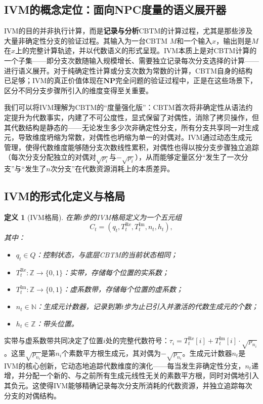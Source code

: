 \documentclass{ctexart}
\newtheorem{definition}[theorem]{定义}
\begin{document}
	\subsection{IVM的概念定位：面向NPC度量的语义展开器}
	
	IVM的目的并非执行计算，而是\textbf{记录与分析}CBTM的计算过程，尤其是那些涉及大量非确定性分支的验证过程。其输入为一台CBTM $M$和一个输入$x$，输出则是$M$在$x$上的完整计算轨迹，并以代数语义的形式呈现。IVM本质上是对CBTM计算的一个子集——即分支次数随输入规模增长、需要独立记录每次分支选择的计算——进行语义展开。对于纯确定性计算或分支次数为常数的计算，CBTM自身的结构已足够；IVM的真正价值体现在$\mathbf{NP}$完全问题的验证过程中，正是在这些场景下，区分不同分支步骤所引入的维度变得至关重要。
	
	我们可以将IVM理解为CBTM的``度量强化版''：CBTM首次将非确定性从语法约定提升为代数事实，内建了不可公度性，显式保留了对偶性，消除了拷贝操作，但其代数结构是静态的——无论发生多少次非确定性分支，所有分支共享同一对生成元，导致维度坍缩为常数，对偶性也坍缩为单一的对偶对。IVM通过动态生成元管理，使得代数维度能够随分支次数线性累积，对偶性也得以按分支步骤独立追踪（每次分支分配独立的对偶对$\sqrt{p_i}$与$-\sqrt{p_i}$），从而能够定量区分``发生了一次分支''与``发生了$n$次分支''在代数资源消耗上的本质差异。
	
	\subsection{IVM的形式化定义与格局}
	
	\begin{definition}[IVM格局]\label{def:ivm-config}
		在第$t$步的IVM格局定义为一个五元组
		\[
		C_t = (q_t, T_t^{\mathrm{Re}}, T_t^{\mathrm{Im}}, n_t, h_t),
		\]
		其中：
		\begin{itemize}
			\item $q_t\in Q$：控制状态，与底层CBTM的当前状态相同；
			\item $T_t^{\mathrm{Re}}:\mathbb{Z}\to\{0,1\}$：实带，存储每个位置的实系数；
			\item $T_t^{\mathrm{Im}}:\mathbb{Z}\to\{0,1\}$：虚系数带，存储每个位置的虚系数；
			\item $n_t\in\mathbb{N}$：生成元计数器，记录到第$t$步为止已引入并激活的代数生成元的个数；
			\item $h_t\in\mathbb{Z}$：带头位置。
		\end{itemize}
	\end{definition}
	
	实带与虚系数带共同决定了位置$i$处的完整代数符号：$\tau_i = T_t^{\mathrm{Re}}[i] + T_t^{\mathrm{Im}}[i]\cdot\sqrt{p_{n_i}}$。这里$\sqrt{p_{n_i}}$是第$n_i$个素数平方根生成元，其对偶为$-\sqrt{p_{n_i}}$。生成元计数器$n_t$是IVM的核心创新，它动态地追踪代数维度的演化——每当发生非确定性分支，$n_t$递增，并分配一个新的、与之前所有生成元线性无关的素数平方根，同时对偶地引入其负元。这使得IVM能够精确记录每次分支所消耗的代数资源，并独立追踪每次分支的对偶结构。
	
\end{document}
